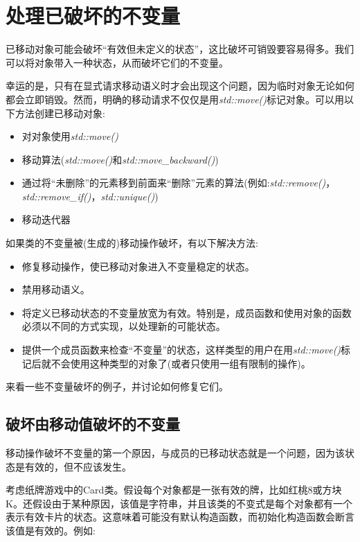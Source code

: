 \section{处理已破坏的不变量}
已移动对象可能会破坏“有效但未定义的状态”，这比破坏可销毁要容易得多。我们可以将对象带入一种状态，从而破坏它们的不变量。

幸运的是，只有在显式请求移动语义时才会出现这个问题，因为临时对象无论如何都会立即销毁。然而，明确的移动请求不仅仅是用\textit{std::move()}标记对象。可以用以下方法创建已移动对象:

\begin{itemize}
	\item 对对象使用\textit{std::move()}
	\item 移动算法(\textit{std::move()}和\textit{std::move_backward()})
	\item 通过将“未删除”的元素移到前面来“删除”元素的算法(例如:\textit{std::remove()}，\textit{std::remove_if()}，\textit{std::unique()})
	\item 移动迭代器
\end{itemize}

如果类的不变量被(生成的)移动操作破坏，有以下解决方法:

\begin{itemize}
	\item 修复移动操作，使已移动对象进入不变量稳定的状态。
	\item 禁用移动语义。
	\item 将定义已移动状态的不变量放宽为有效。特别是，成员函数和使用对象的函数必须以不同的方式实现，以处理新的可能状态。
	\item 提供一个成员函数来检查“不变量”的状态，这样类型的用户在用\textit{std::move()}标记后就不会使用这种类型的对象了(或者只使用一组有限制的操作)。
\end{itemize}

来看一些不变量破坏的例子，并讨论如何修复它们。

\subsection{破坏由移动值破坏的不变量}

移动操作破坏不变量的第一个原因，与成员的已移动状态就是一个问题，因为该状态是有效的，但不应该发生。

考虑纸牌游戏中的Card类。假设每个对象都是一张有效的牌，比如红桃8或方块K。还假设由于某种原因，该值是字符串，并且该类的不变式是每个对象都有一个表示有效卡片的状态。这意味着可能没有默认构造函数，而初始化构造函数会断言该值是有效的。例如:

